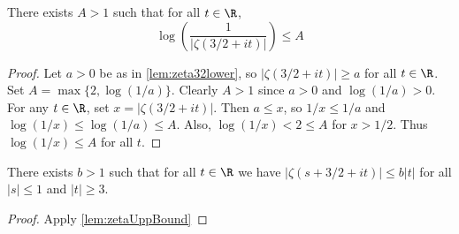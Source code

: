 \begin{lemma}\label{lem:zeta32lower_log}
\leanok
There exists $A>1$ such that for all $t\in\R$,
$$ \log \left(\frac{1}{|\zeta(3/2+it)|}\right) \leq A $$
\end{lemma}
\begin{proof}
\leanok
{}
Let $a>0$ be as in \cref{lem:zeta32lower}, so $|\zeta(3/2+it)| \ge a$ for all $t\in\R$.
Set $A = \max\{2, \log(1/a)\}$. Clearly $A > 1$ since $a > 0$ and $\log(1/a) > 0$.
For any $t\in\R$, set $x = |\zeta(3/2+it)|$. Then $a \leq x$, so $1/x \leq 1/a$ and $\log(1/x) \leq \log(1/a) \leq A$. Also, $\log(1/x) < 2 \leq A$ for $x > 1/2$.
Thus $\log(1/x) \leq A$ for all $t$.
\end{proof}


\begin{lemma}\label{lem:zeta32upper_pre}
\leanok
There exists $b>1$ such that for all $t\in\R$ we have $|\zeta(s+3/2+it)| \le b|t|$ for all $|s|\le 1$ and $|t|\ge3$.
\end{lemma}
\begin{proof}
\leanok
{}
Apply \cref{lem:zetaUppBound}
\end{proof}


